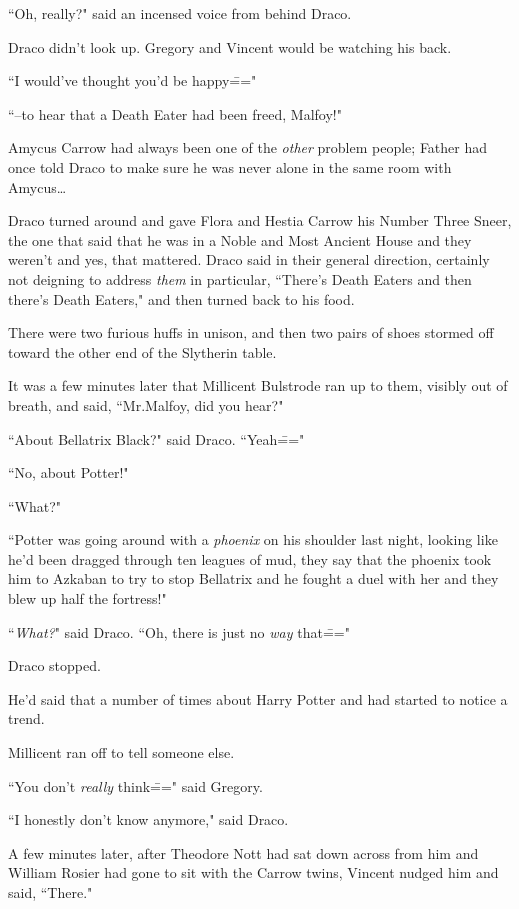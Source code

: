 ``Oh, really?" said an incensed voice from behind Draco.

Draco didn't look up. Gregory and Vincent would be watching his back.

``I would've thought you'd be happy\==="

``\---to hear that a Death Eater had been freed, Malfoy!"

Amycus Carrow had always been one of the \emph{other} problem people; Father had once told Draco to make sure he was never alone in the same room with Amycus{\ldots}

Draco turned around and gave Flora and Hestia Carrow his Number Three Sneer, the one that said that he was in a Noble and Most Ancient House and they weren't and yes, that mattered. Draco said in their general direction, certainly not deigning to address \emph{them} in particular, ``There's Death Eaters and then there's Death Eaters," and then turned back to his food.

There were two furious huffs in unison, and then two pairs of shoes stormed off toward the other end of the Slytherin table.

It was a few minutes later that Millicent Bulstrode ran up to them, visibly out of breath, and said, ``Mr.\?Malfoy, did you hear?"

``About Bellatrix Black?" said Draco. ``Yeah\==="

``No, about Potter!"

``What?"

``Potter was going around with a \emph{phoenix} on his shoulder last night, looking like he'd been dragged through ten leagues of mud, they say that the phoenix took him to Azkaban to try to stop Bellatrix and he fought a duel with her and they blew up half the fortress!"

``\emph{What?}" said Draco. ``Oh, there is just no \emph{way} that\==="

Draco stopped.

He'd said that a number of times about Harry Potter and had started to notice a trend.

Millicent ran off to tell someone else.

``You don't \emph{really} think\===" said Gregory.

``I honestly don't know anymore," said Draco.

A few minutes later, after Theodore Nott had sat down across from him and William Rosier had gone to sit with the Carrow twins, Vincent nudged him and said, ``There."

